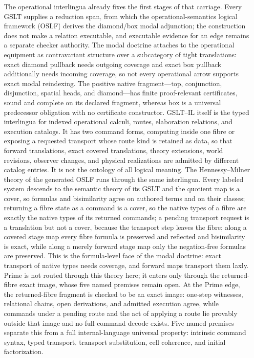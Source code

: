 \documentclass[11pt]{article}
\theoremstyle{definition}
\theoremstyle{remark}
\begin{document}
The operational interlingua already fixes the first stages of that carriage.
Every GSLT supplies a reduction span, from which the operational-semantics
logical framework (OSLF) derives the diamond/box modal adjunction; the
construction does not make a relation executable, and executable evidence for
an edge remains a separate checker authority.  The modal doctrine attaches to
the operational equipment as contravariant structure over a subcategory of
tight translations: exact diamond pullback needs outgoing coverage and exact
box pullback additionally needs incoming coverage, so not every operational
arrow supports exact modal reindexing.  The positive native fragment---top,
conjunction, disjunction, spatial heads, and diamond---has finite
proof-relevant certificates, sound and complete on its declared fragment,
whereas box is a universal predecessor obligation with no certificate
constructor.  GSLT--IL itself is the typed interlingua for indexed operational
calculi, routes, elaboration relations, and execution catalogs.  It has two
command forms, computing inside one fibre or exposing a requested transport
whose route kind is retained as data, so that forward translations, exact
covered translations, theory extensions, world revisions, observer changes,
and physical realizations are admitted by different catalog entries.  It is
not the ontology of all logical meaning.  The Hennessy--Milner theory of the
generated OSLF runs through the same interlingua.  Every labeled system
descends to the semantic theory of its GSLT and the quotient map is a cover,
so formulas and bisimilarity agree on authored terms and on their classes;
returning a fibre state as a command is a cover, so the native types of a
fibre are exactly the native types of its returned commands; a pending
transport request is a translation but not a cover, because the transport step
leaves the fibre; along a covered stage map every fibre formula is preserved
and reflected and bisimilarity is exact, while along a merely forward stage
map only the negation-free formulas are preserved.  This is the formula-level
face of the modal doctrine: exact transport of native types needs coverage,
and forward maps transport them laxly.  Prime is not routed through this
theory here; it enters only through the returned-fibre exact image, whose
five named premises remain open.  At the Prime edge, the
returned-fibre fragment is checked to be an exact image: one-step witnesses,
relational chains, open derivations, and admitted execution agree, while
commands under a pending route and the act of applying a route lie provably
outside that image and no full command decode exists.  Five named premises
separate this from a full internal-language universal property: intrinsic
command syntax, typed transport, transport substitution, cell coherence, and
initial factorization.
\end{document}
